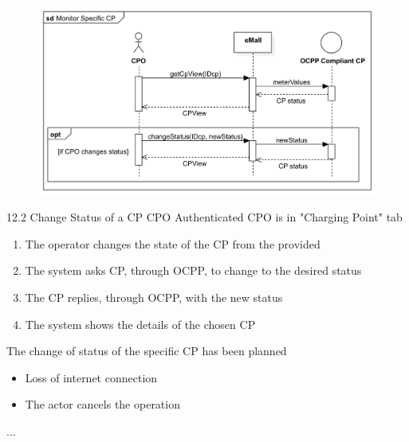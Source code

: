 \usecase
{
    \begin{figure}[H]
        \centering
        \includegraphics[scale=0.9]{src/sequence_diagram/monitorSpecificCP.png}
    \end{figure}
}
{12.2}
{Change Status of a CP} %
{CPO} %
{Authenticated CPO is in "Charging Point" tab} %
{ %
    \begin{enumerate}
        \item The operator changes the state of the CP from the provided
        \item The system asks CP, through OCPP, to change to the desired status
        \item The CP replies, through OCPP, with the new status
        \item The system shows the details of the chosen CP
    \end{enumerate}
}
{The change of status of the specific CP has been planned} %
{ %
    \begin{itemize}
        \item Loss of internet connection
        \item The actor cancels the operation
    \end{itemize}
}
{ %
    ...
}

